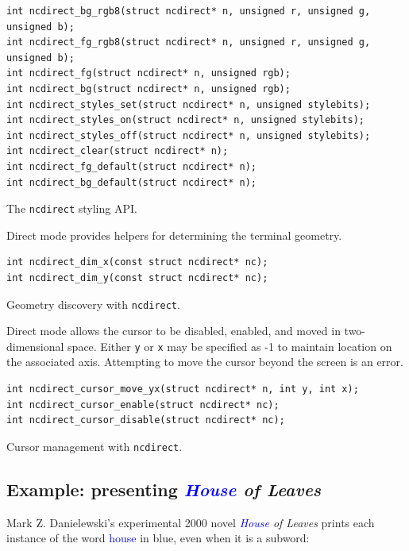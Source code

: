 \documentclass[letterpaper,10pt]{article}
\begin{document}
\begin{listing}[!htb]
\begin{verbatim}
int ncdirect_bg_rgb8(struct ncdirect* n, unsigned r, unsigned g, unsigned b);
int ncdirect_fg_rgb8(struct ncdirect* n, unsigned r, unsigned g, unsigned b);
int ncdirect_fg(struct ncdirect* n, unsigned rgb);
int ncdirect_bg(struct ncdirect* n, unsigned rgb);
int ncdirect_styles_set(struct ncdirect* n, unsigned stylebits);
int ncdirect_styles_on(struct ncdirect* n, unsigned stylebits);
int ncdirect_styles_off(struct ncdirect* n, unsigned stylebits);
int ncdirect_clear(struct ncdirect* n);
int ncdirect_fg_default(struct ncdirect* n);
int ncdirect_bg_default(struct ncdirect* n);
\end{verbatim}
\caption{The \texttt{ncdirect} styling API.}
\end{listing}

Direct mode provides helpers for determining the terminal geometry.

\begin{listing}[!htb]
\begin{verbatim}
int ncdirect_dim_x(const struct ncdirect* nc);
int ncdirect_dim_y(const struct ncdirect* nc);
\end{verbatim}
\caption{Geometry discovery with \texttt{ncdirect}.}
\end{listing}

Direct mode allows the cursor to be disabled, enabled, and moved in
two-dimensional space. Either \texttt{y} or \texttt{x} may be specified as -1
to maintain location on the associated axis. Attempting to move the cursor
beyond the screen is an error.

\begin{listing}[!htb]
\begin{verbatim}
int ncdirect_cursor_move_yx(struct ncdirect* n, int y, int x);
int ncdirect_cursor_enable(struct ncdirect* nc);
int ncdirect_cursor_disable(struct ncdirect* nc);
\end{verbatim}
\caption{Cursor management with \texttt{ncdirect}.}
\end{listing}

\subsection{Example: presenting \textit{\textcolor{blue}{House} of Leaves}}
Mark Z. Danielewski's experimental 2000 novel \textit{\textcolor{blue}{House} of Leaves}\cite{danielewski2000house} prints each
instance of the word \textcolor{blue}{house} in blue, even when it is a subword:
\end{document}
